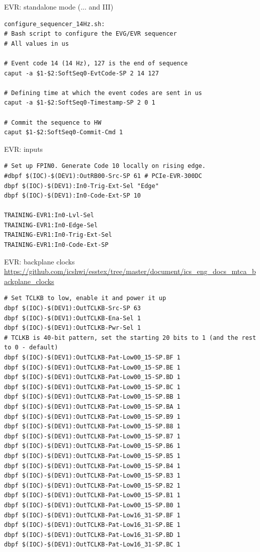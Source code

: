 \documentclass[
  9pt
  , table
  , ignorenonframetext
]{beamer}
\begin{document}
\begin{frame}[fragile]{EVR: standalone mode (... and III)}
\begin{lstlisting}[style=termstyle,breaklines=true,basicstyle=\scriptsize]
configure_sequencer_14Hz.sh:
# Bash script to configure the EVG/EVR sequencer
# All values in us

# Event code 14 (14 Hz), 127 is the end of sequence
caput -a $1-$2:SoftSeq0-EvtCode-SP 2 14 127

# Defining time at which the event codes are sent in us
caput -a $1-$2:SoftSeq0-Timestamp-SP 2 0 1

# Commit the sequence to HW
caput $1-$2:SoftSeq0-Commit-Cmd 1

\end{lstlisting}
\end{frame}

\begin{frame}[fragile]{EVR: inputs}
\begin{lstlisting}[style=termstyle,breaklines=true,basicstyle=\scriptsize]
# Set up FPIN0. Generate Code 10 locally on rising edge.
#dbpf $(IOC)-$(DEV1):OutRB00-Src-SP 61 # PCIe-EVR-300DC
dbpf $(IOC)-$(DEV1):In0-Trig-Ext-Sel "Edge"
dbpf $(IOC)-$(DEV1):In0-Code-Ext-SP 10

TRAINING-EVR1:In0-Lvl-Sel
TRAINING-EVR1:In0-Edge-Sel
TRAINING-EVR1:In0-Trig-Ext-Sel
TRAINING-EVR1:In0-Code-Ext-SP

\end{lstlisting}
\end{frame}

\begin{frame}[fragile]{EVR: backplane clocks}
\url{https://github.com/icshwi/esstex/tree/master/document/ics_eng_docs_mtca_backplane_clocks}
\begin{lstlisting}[style=termstyle,breaklines=true,basicstyle=\scriptsize]
# Set TCLKB to low, enable it and power it up
dbpf $(IOC)-$(DEV1):OutTCLKB-Src-SP 63
dbpf $(IOC)-$(DEV1):OutTCLKB-Ena-Sel 1
dbpf $(IOC)-$(DEV1):OutTCLKB-Pwr-Sel 1
# TCLKB is 40-bit pattern, set the starting 20 bits to 1 (and the rest to 0 - default)
dbpf $(IOC)-$(DEV1):OutTCLKB-Pat-Low00_15-SP.BF 1
dbpf $(IOC)-$(DEV1):OutTCLKB-Pat-Low00_15-SP.BE 1
dbpf $(IOC)-$(DEV1):OutTCLKB-Pat-Low00_15-SP.BD 1
dbpf $(IOC)-$(DEV1):OutTCLKB-Pat-Low00_15-SP.BC 1
dbpf $(IOC)-$(DEV1):OutTCLKB-Pat-Low00_15-SP.BB 1
dbpf $(IOC)-$(DEV1):OutTCLKB-Pat-Low00_15-SP.BA 1
dbpf $(IOC)-$(DEV1):OutTCLKB-Pat-Low00_15-SP.B9 1
dbpf $(IOC)-$(DEV1):OutTCLKB-Pat-Low00_15-SP.B8 1
dbpf $(IOC)-$(DEV1):OutTCLKB-Pat-Low00_15-SP.B7 1
dbpf $(IOC)-$(DEV1):OutTCLKB-Pat-Low00_15-SP.B6 1
dbpf $(IOC)-$(DEV1):OutTCLKB-Pat-Low00_15-SP.B5 1
dbpf $(IOC)-$(DEV1):OutTCLKB-Pat-Low00_15-SP.B4 1
dbpf $(IOC)-$(DEV1):OutTCLKB-Pat-Low00_15-SP.B3 1
dbpf $(IOC)-$(DEV1):OutTCLKB-Pat-Low00_15-SP.B2 1
dbpf $(IOC)-$(DEV1):OutTCLKB-Pat-Low00_15-SP.B1 1
dbpf $(IOC)-$(DEV1):OutTCLKB-Pat-Low00_15-SP.B0 1
dbpf $(IOC)-$(DEV1):OutTCLKB-Pat-Low16_31-SP.BF 1
dbpf $(IOC)-$(DEV1):OutTCLKB-Pat-Low16_31-SP.BE 1
dbpf $(IOC)-$(DEV1):OutTCLKB-Pat-Low16_31-SP.BD 1
dbpf $(IOC)-$(DEV1):OutTCLKB-Pat-Low16_31-SP.BC 1
\end{lstlisting}
\end{frame}
\end{document}
